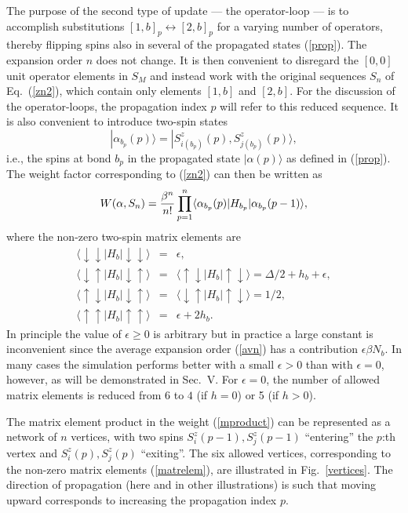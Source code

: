 \documentclass[10pt,pre,aps,twocolumn,showpacs,superscriptaddress,
floatfix]{revtex4}
\begin{document}
The purpose of the second type of update --- the operator-loop \cite{sse3} --- 
is to accomplish substitutions $[1,b]_p \leftrightarrow [2,b]_p$ for a varying
number of operators, thereby flipping spins also in several of the propagated 
states (\ref{prop}). The expansion order $n$ does not change. It is then 
convenient to disregard the $[0,0]$ unit operator elements in $S_M$ and 
instead work with the original sequences $S_n$ of Eq.~(\ref{zn2}), which
contain only elements $[1,b]$ and $[2,b]$. For the discussion of the 
operator-loops, the propagation index $p$ will refer to this reduced 
sequence. It is also convenient to introduce two-spin states
\begin{equation}
|\alpha_{b_p}(p)\rangle = |S^z_{i(b_p)}(p),S^z_{j(b_p)}(p)\rangle ,
\label{alphap}
\end{equation}
i.e., the spins at bond $b_p$ in the propagated state $|\alpha (p)\rangle$ 
as defined in (\ref{prop}). The weight factor corresponding to (\ref{zn2}) 
can then be written as
\begin{equation}
W(\alpha,S_n) = {\beta^n\over n!}\prod\limits_{p=1}^n 
\langle \alpha_{b_p} (p) | H_{b_p} | \alpha_{b_p}(p-1) \rangle ,
\label{mproduct}
\end{equation}
where the non-zero two-spin matrix elements are
\begin{eqnarray}
\langle \downarrow \downarrow | H_b | \downarrow \downarrow \rangle &=&
\epsilon, \nonumber \\
\langle \downarrow \uparrow | H_b | \downarrow \uparrow \rangle &=&
\langle \uparrow \downarrow | H_b | \uparrow \downarrow \rangle =
\Delta /2 + h_b + \epsilon,  \nonumber  \\
\langle \uparrow \downarrow | H_b | \downarrow \uparrow \rangle &  = &
\langle \downarrow \uparrow | H_b | \uparrow \downarrow \rangle = 1/2,
\label{matrelem} \\
\langle \uparrow \uparrow | H_b | \uparrow \uparrow \rangle &=&
\epsilon + 2h_b .  \nonumber  
\nonumber
\end{eqnarray}
In principle the value of $\epsilon \ge 0$ is arbitrary but in practice a 
large constant is inconvenient since the average expansion order (\ref{avn})
has a contribution $\epsilon\beta N_b$. In many cases the simulation 
performs better with a small $\epsilon >0$ than with $\epsilon = 0$, however, 
as will be demonstrated in Sec.~V. For $\epsilon=0$, the number of allowed 
matrix elements is reduced from 6 to $4$ (if $h=0$) or 5 (if $h > 0$). 

The matrix element product in the weight (\ref{mproduct}) can be represented 
as a network of $n$ vertices, with two spins $S^z_{i}(p-1),S^z_{j}(p-1)$ 
``entering'' the $p$:th vertex and $S^z_{i}(p),S^z_{j}(p)$ ``exiting''. 
The six allowed vertices, corresponding to the non-zero matrix elements 
(\ref{matrelem}), are illustrated in Fig.~\ref{vertices}. The direction of 
propagation (here and in other illustrations) is such that moving upward 
corresponds to increasing the propagation  index $p$. 
\end{document}
